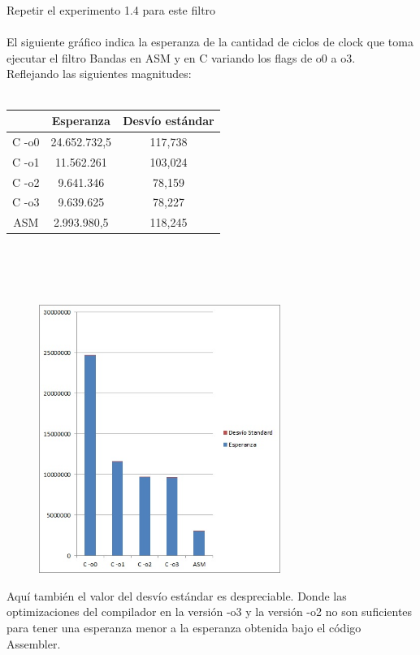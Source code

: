 Repetir el experimento 1.4 para este filtro \\
\\
El siguiente gr\'afico indica la esperanza de la cantidad de ciclos de clock que toma ejecutar el filtro Bandas en ASM y en C variando los flags de o0 a o3. \\
Reflejando las siguientes magnitudes: \\
\\
 \begin{tabular}[c]{|c|c|c|}
	\hline
		 & Esperanza & Desv\'io est\'andar\\
		\hline
C -o0 & 24.652.732,5 & 117,738 \\
\hline
C -o1 & 11.562.261 & 103,024  \\
\hline
C -o2 & 9.641.346 & 78,159  \\
\hline
C -o3 & 9.639.625 & 78,227 \\
\hline
ASM & 2.993.980,5 & 118,245 \\
\hline
	\end{tabular}\\\\
\\

\begin{figure}[h!]
  \begin{center}
	\includegraphics[width=0.7\textwidth]{imagenes/41.jpg}
  \end{center}
\end{figure}
Aqu\'i tambi\'en el valor del desv\'io est\'andar es despreciable. Donde las optimizaciones del compilador en la versi\'on -o3 y la versi\'on -o2 no son suficientes para tener una esperanza menor a la esperanza obtenida bajo el c\'odigo Assembler.\\

\newpage